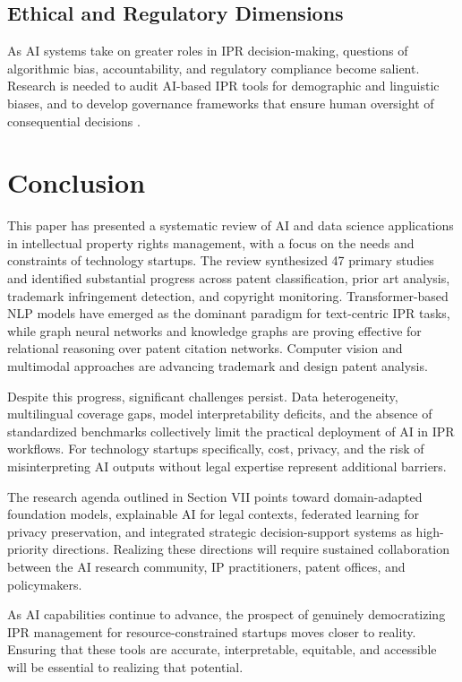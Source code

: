 \documentclass[conference]{IEEEtran}
\begin{document}
\subsection{Ethical and Regulatory Dimensions}

As AI systems take on greater roles in IPR decision-making, questions of algorithmic bias, accountability, and regulatory compliance become salient. Research is needed to audit AI-based IPR tools for demographic and linguistic biases, and to develop governance frameworks that ensure human oversight of consequential decisions \cite{ref38}.

\section{Conclusion}

This paper has presented a systematic review of AI and data science applications in intellectual property rights management, with a focus on the needs and constraints of technology startups. The review synthesized 47 primary studies and identified substantial progress across patent classification, prior art analysis, trademark infringement detection, and copyright monitoring. Transformer-based NLP models have emerged as the dominant paradigm for text-centric IPR tasks, while graph neural networks and knowledge graphs are proving effective for relational reasoning over patent citation networks. Computer vision and multimodal approaches are advancing trademark and design patent analysis.

Despite this progress, significant challenges persist. Data heterogeneity, multilingual coverage gaps, model interpretability deficits, and the absence of standardized benchmarks collectively limit the practical deployment of AI in IPR workflows. For technology startups specifically, cost, privacy, and the risk of misinterpreting AI outputs without legal expertise represent additional barriers.

The research agenda outlined in Section VII points toward domain-adapted foundation models, explainable AI for legal contexts, federated learning for privacy preservation, and integrated strategic decision-support systems as high-priority directions. Realizing these directions will require sustained collaboration between the AI research community, IP practitioners, patent offices, and policymakers.

As AI capabilities continue to advance, the prospect of genuinely democratizing IPR management for resource-constrained startups moves closer to reality. Ensuring that these tools are accurate, interpretable, equitable, and accessible will be essential to realizing that potential.
\end{document}
